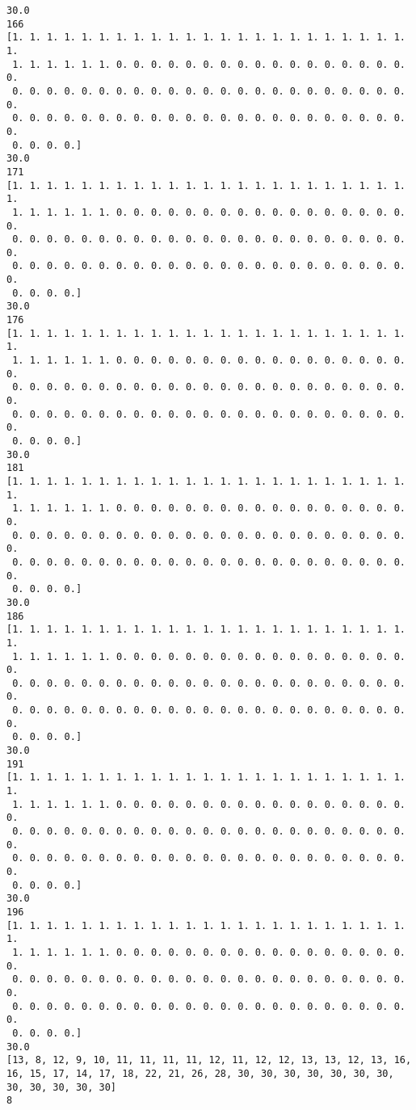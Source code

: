 \documentclass[11pt]{article}
\begin{document}
\begin{Verbatim}[commandchars=\\\{\}]
30.0
166
[1. 1. 1. 1. 1. 1. 1. 1. 1. 1. 1. 1. 1. 1. 1. 1. 1. 1. 1. 1. 1. 1. 1. 1.
 1. 1. 1. 1. 1. 1. 0. 0. 0. 0. 0. 0. 0. 0. 0. 0. 0. 0. 0. 0. 0. 0. 0. 0.
 0. 0. 0. 0. 0. 0. 0. 0. 0. 0. 0. 0. 0. 0. 0. 0. 0. 0. 0. 0. 0. 0. 0. 0.
 0. 0. 0. 0. 0. 0. 0. 0. 0. 0. 0. 0. 0. 0. 0. 0. 0. 0. 0. 0. 0. 0. 0. 0.
 0. 0. 0. 0.]
30.0
171
[1. 1. 1. 1. 1. 1. 1. 1. 1. 1. 1. 1. 1. 1. 1. 1. 1. 1. 1. 1. 1. 1. 1. 1.
 1. 1. 1. 1. 1. 1. 0. 0. 0. 0. 0. 0. 0. 0. 0. 0. 0. 0. 0. 0. 0. 0. 0. 0.
 0. 0. 0. 0. 0. 0. 0. 0. 0. 0. 0. 0. 0. 0. 0. 0. 0. 0. 0. 0. 0. 0. 0. 0.
 0. 0. 0. 0. 0. 0. 0. 0. 0. 0. 0. 0. 0. 0. 0. 0. 0. 0. 0. 0. 0. 0. 0. 0.
 0. 0. 0. 0.]
30.0
176
[1. 1. 1. 1. 1. 1. 1. 1. 1. 1. 1. 1. 1. 1. 1. 1. 1. 1. 1. 1. 1. 1. 1. 1.
 1. 1. 1. 1. 1. 1. 0. 0. 0. 0. 0. 0. 0. 0. 0. 0. 0. 0. 0. 0. 0. 0. 0. 0.
 0. 0. 0. 0. 0. 0. 0. 0. 0. 0. 0. 0. 0. 0. 0. 0. 0. 0. 0. 0. 0. 0. 0. 0.
 0. 0. 0. 0. 0. 0. 0. 0. 0. 0. 0. 0. 0. 0. 0. 0. 0. 0. 0. 0. 0. 0. 0. 0.
 0. 0. 0. 0.]
30.0
181
[1. 1. 1. 1. 1. 1. 1. 1. 1. 1. 1. 1. 1. 1. 1. 1. 1. 1. 1. 1. 1. 1. 1. 1.
 1. 1. 1. 1. 1. 1. 0. 0. 0. 0. 0. 0. 0. 0. 0. 0. 0. 0. 0. 0. 0. 0. 0. 0.
 0. 0. 0. 0. 0. 0. 0. 0. 0. 0. 0. 0. 0. 0. 0. 0. 0. 0. 0. 0. 0. 0. 0. 0.
 0. 0. 0. 0. 0. 0. 0. 0. 0. 0. 0. 0. 0. 0. 0. 0. 0. 0. 0. 0. 0. 0. 0. 0.
 0. 0. 0. 0.]
30.0
186
[1. 1. 1. 1. 1. 1. 1. 1. 1. 1. 1. 1. 1. 1. 1. 1. 1. 1. 1. 1. 1. 1. 1. 1.
 1. 1. 1. 1. 1. 1. 0. 0. 0. 0. 0. 0. 0. 0. 0. 0. 0. 0. 0. 0. 0. 0. 0. 0.
 0. 0. 0. 0. 0. 0. 0. 0. 0. 0. 0. 0. 0. 0. 0. 0. 0. 0. 0. 0. 0. 0. 0. 0.
 0. 0. 0. 0. 0. 0. 0. 0. 0. 0. 0. 0. 0. 0. 0. 0. 0. 0. 0. 0. 0. 0. 0. 0.
 0. 0. 0. 0.]
30.0
191
[1. 1. 1. 1. 1. 1. 1. 1. 1. 1. 1. 1. 1. 1. 1. 1. 1. 1. 1. 1. 1. 1. 1. 1.
 1. 1. 1. 1. 1. 1. 0. 0. 0. 0. 0. 0. 0. 0. 0. 0. 0. 0. 0. 0. 0. 0. 0. 0.
 0. 0. 0. 0. 0. 0. 0. 0. 0. 0. 0. 0. 0. 0. 0. 0. 0. 0. 0. 0. 0. 0. 0. 0.
 0. 0. 0. 0. 0. 0. 0. 0. 0. 0. 0. 0. 0. 0. 0. 0. 0. 0. 0. 0. 0. 0. 0. 0.
 0. 0. 0. 0.]
30.0
196
[1. 1. 1. 1. 1. 1. 1. 1. 1. 1. 1. 1. 1. 1. 1. 1. 1. 1. 1. 1. 1. 1. 1. 1.
 1. 1. 1. 1. 1. 1. 0. 0. 0. 0. 0. 0. 0. 0. 0. 0. 0. 0. 0. 0. 0. 0. 0. 0.
 0. 0. 0. 0. 0. 0. 0. 0. 0. 0. 0. 0. 0. 0. 0. 0. 0. 0. 0. 0. 0. 0. 0. 0.
 0. 0. 0. 0. 0. 0. 0. 0. 0. 0. 0. 0. 0. 0. 0. 0. 0. 0. 0. 0. 0. 0. 0. 0.
 0. 0. 0. 0.]
30.0
[13, 8, 12, 9, 10, 11, 11, 11, 11, 12, 11, 12, 12, 13, 13, 12, 13, 16, 16, 15, 17, 14, 17, 18, 22, 21, 26, 28, 30, 30, 30, 30, 30, 30, 30, 30, 30, 30, 30, 30]
8

    \end{Verbatim}
\end{document}
